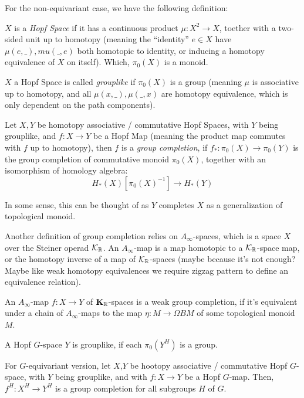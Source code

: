 \documentclass{article}
\begin{document}
For the non-equivariant case, we have the following definition:
\begin{defn}
    $X$ is a \emph{Hopf Space} if it has a continuous product $\mu:X^2\rightarrow X$, toether with a two-sided unit up to homotopy (meaning the ``identity'' $e\in X$ have $\mu(e,\_),mu(\_,e)$ both homotopic to identity, or inducing a homotopy equivalence of $X$ on itself). Which, $\pi_0 (X)$ is a monoid.

    $X$ a Hopf Space is called \emph{grouplike} if $\pi_0 (X)$ is a group (meaning $\mu$ is associative up to homotopy, and all $\mu(x,\_),\mu(\_,x)$ are homotopy equivalence, which is only dependent on the path components).

    \hfil

    Let $X,Y$ be homotopy associative / commutative Hopf Spaces, with $Y$ being grouplike, and $f:X\rightarrow Y$ be a Hopf Map (meaning the product map commutes with $f$ up to homotopy), then $f$ is a \emph{group completion}, if $f_*:\pi_0(X)\rightarrow\pi_0(Y)$ is the group completion of commutative monoid $\pi_0 (X)$, together with an isomorphism of homology algebra:
    \[H_*(X)[\pi_0(X)^{-1}]\rightarrow H_* (Y)\]
\end{defn}
In some sense, this can be thought of as $Y$ completes $X$ as a generalization of topological monoid.

\hfil

Another definition of group completion relies on $A_\infty$-spaces, which is a space $X$ over the Steiner operad $\mathcal{K}_{\mathbb{R}}$. An $A_\infty$-map is a map homotopic to a $\mathcal{K}_{\mathbb{R}}$-space map, or the homotopy inverse of a map of $\mathcal{K}_{\mathbb{R}}$-spaces (maybe because it's not enough? Maybe like weak homotopy equivalences we require zigzag pattern to define an equivalence relation).

\begin{thm}
    An $A_\infty$-map $f:X\rightarrow Y$ of $\mathbf{K}_{\mathbb{R}}$-spaces is a weak group completion, if it's equivalent under a chain of $A_\infty$-maps to the map $\eta:M\rightarrow \Omega BM$ of some topological monoid $M$.
\end{thm} 

\begin{defn}
    A Hopf $G$-space $Y$ is grouplike, if each $\pi_0 (Y^H)$ is a group. 
    
    For $G$-equivariant version, let $X$,$Y$ be hootopy associative / commutative Hopf $G$-space, with $Y$ being grouplike, and with $f:X\rightarrow Y$ be a Hopf $G$-map. Then, $f^H:X^H\rightarrow Y^H$ is a group completion for all subgroups $H$ of $G$.
\end{defn}
\end{document}
